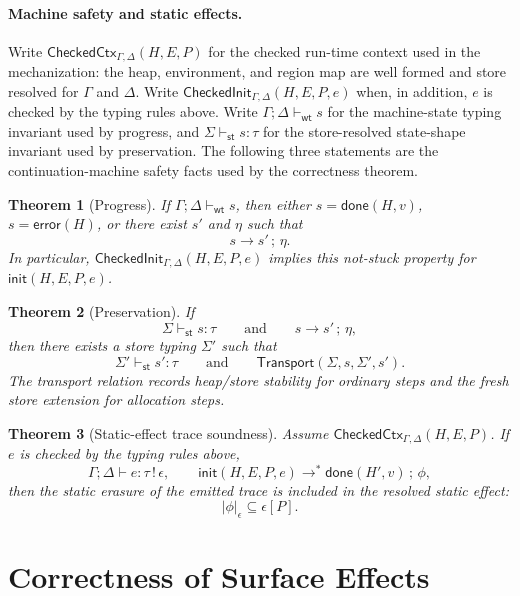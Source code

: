 \documentclass[10pt,a4paper]{article}
\newcommand{\staticset}[1]{\lvert #1\rvert_{\epsilon}}
\newtheorem{theorem}{Theorem}
\begin{document}
\paragraph{Machine safety and static effects.}
Write $\mathsf{CheckedCtx}_{\Gamma,\Delta}(H,E,P)$ for the checked run-time
context used in the mechanization: the heap, environment, and region map are
well formed and store resolved for $\Gamma$ and $\Delta$. Write
$\mathsf{CheckedInit}_{\Gamma,\Delta}(H,E,P,e)$ when, in addition, $e$ is
checked by the typing rules above. Write
$\Gamma;\Delta\vdash_{\mathsf{wt}}s$ for the machine-state typing invariant
used by progress, and $\Sigma\vdash_{\mathsf{st}}s:\tau$ for the
store-resolved state-shape invariant used by preservation. The following three
statements are the continuation-machine safety facts used by the correctness
theorem.

\begin{theorem}[Progress]\label{thm:progress}
If $\Gamma;\Delta\vdash_{\mathsf{wt}}s$, then either
$s=\mathsf{done}(H,v)$, $s=\mathsf{error}(H)$, or there exist $s'$ and $\eta$
such that
\[
s\longrightarrow s'\,;\,\eta.
\]
In particular, $\mathsf{CheckedInit}_{\Gamma,\Delta}(H,E,P,e)$ implies this
not-stuck property for $\mathsf{init}(H,E,P,e)$.
\end{theorem}

\begin{theorem}[Preservation]\label{thm:preservation}
If
\[
\Sigma\vdash_{\mathsf{st}} s : \tau
\qquad\text{and}\qquad
s\longrightarrow s'\,;\,\eta,
\]
then there exists a store typing $\Sigma'$ such that
\[
\Sigma'\vdash_{\mathsf{st}} s' : \tau
\qquad\text{and}\qquad
\mathsf{Transport}(\Sigma,s,\Sigma',s').
\]
The transport relation records heap/store stability for ordinary steps and the
fresh store extension for allocation steps.
\end{theorem}

\begin{theorem}[Static-effect trace soundness]
\label{thm:static-effect-trace-soundness}
Assume $\mathsf{CheckedCtx}_{\Gamma,\Delta}(H,E,P)$. If $e$ is checked by the
typing rules above,
\[
\Gamma;\Delta\vdash e:\tau\,!\,\epsilon,
\qquad
\mathsf{init}(H,E,P,e)
  \longrightarrow^{*}
  \mathsf{done}(H',v)\,;\,\phi,
\]
then the static erasure of the emitted trace is included in the resolved
static effect:
\[
\staticset{\phi}\subseteq\epsilon[P].
\]
\end{theorem}

\section{Correctness of Surface Effects}
\label{sec:correctness}
\end{document}
